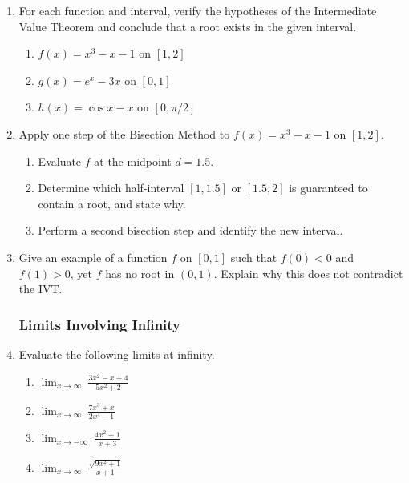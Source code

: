 \begin{enumerate}
\subsubsection*{The Intermediate Value Theorem}

\item For each function and interval, verify the hypotheses of the
      Intermediate Value Theorem and conclude that a root exists
      in the given interval.
      \begin{enumerate}
        \item $f(x) = x^3 - x - 1$ on $[1, 2]$
        \item $g(x) = e^x - 3x$ on $[0, 1]$
        \item $h(x) = \cos x - x$ on $[0, \pi/2]$
      \end{enumerate}

\item Apply one step of the Bisection Method to
      $f(x) = x^3 - x - 1$ on $[1, 2]$.
      \begin{enumerate}
        \item Evaluate $f$ at the midpoint $d = 1.5$.
        \item Determine which half-interval $[1, 1.5]$ or
              $[1.5, 2]$ is guaranteed to contain a root, and
              state why.
        \item Perform a second bisection step and identify the
              new interval.
      \end{enumerate}

\item Give an example of a function $f$ on $[0, 1]$ such that
      $f(0) < 0$ and $f(1) > 0$, yet $f$ has no root in $(0, 1)$.
      Explain why this does not contradict the IVT.

\subsubsection*{Limits Involving Infinity}

\item Evaluate the following limits at infinity.
      \begin{enumerate}
        \item $\displaystyle\lim_{x \to \infty}\ \frac{3x^2 - x + 4}{5x^2 + 2}$
        \item $\displaystyle\lim_{x \to \infty}\ \frac{7x^3 + x}{2x^4 - 1}$
        \item $\displaystyle\lim_{x \to -\infty}\ \frac{4x^2 + 1}{x + 3}$
        \item $\displaystyle\lim_{x \to \infty}\ \frac{\sqrt{9x^2 + 1}}{x + 1}$
      \end{enumerate}


\end{enumerate}
